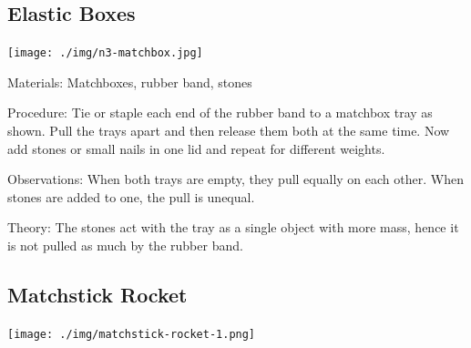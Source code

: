 \begin{multicols}{2}
\columnbreak

\subsection{Elastic Boxes}

\begin{center}
\texttt{[image: ./img/n3-matchbox.jpg]}
\end{center}

\begin{description*}
\item[Materials:]{Matchboxes, rubber band, stones}
\item[Procedure:]{Tie or staple each end of the rubber band to a matchbox tray as shown. Pull the trays apart and then release them both at the same time. Now add stones or small nails in one lid and repeat for different weights.}
\item[Observations:]{When both trays are empty, they pull equally on each other. When stones are added to one, the pull is unequal.}
\item[Theory:]{The stones act with the tray as a single object with more mass, hence it is not pulled as much by the rubber band.}
\end{description*}

\subsection{Matchstick Rocket}

\begin{center}
\texttt{[image: ./img/matchstick-rocket-1.png]}
\end{center}


\end{multicols}
